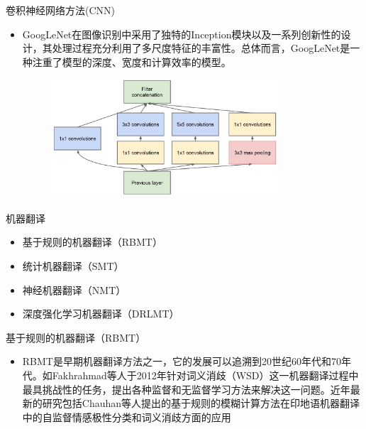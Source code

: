\documentclass[UTF8]{beamer}
\begin{document}
\begin{frame}{卷积神经网络方法(CNN)}
    \scriptsize
    \begin{itemize}
        \item GoogLeNet在图像识别中采用了独特的Inception模块以及一系列创新性的设计，其处理过程充分利用了多尺度特征的丰富性。总体而言，GoogLeNet是一种注重了模型的深度、宽度和计算效率的模型。

        \begin{figure}[H]
            \centering
            \includegraphics[width=0.8\textwidth]{img/2-Image Recognition/5.jpg}
        \end{figure}
    \end{itemize}
\end{frame}

\begin{frame}{机器翻译}
    \begin{itemize}
        \item 基于规则的机器翻译（RBMT）
        \item 统计机器翻译（SMT）
        \item 神经机器翻译（NMT）
        \item 深度强化学习机器翻译（DRLMT）
    \end{itemize}
\end{frame}

\begin{frame}{基于规则的机器翻译（RBMT）}
    \begin{itemize}
        \item RBMT是早期机器翻译方法之一，它的发展可以追溯到20世纪60年代和70年代。如Fakhrahmad等人于2012年针对词义消歧（WSD）这一机器翻译过程中最具挑战性的任务，提出各种监督和无监督学习方法来解决这一问题。近年最新的研究包括Chauhan等人提出的基于规则的模糊计算方法在印地语机器翻译中的自监督情感极性分类和词义消歧方面的应用
    \end{itemize}
\end{frame}
\end{document}
